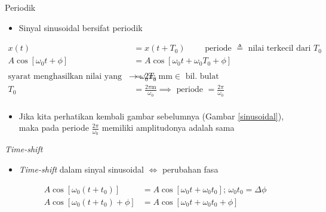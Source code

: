 \documentclass[aspectratio=169]{beamer}
\begin{document}
\begin{frame}{Periodik}
	\begin{itemize}
		\item Sinyal sinusoidal bersifat periodik
	\end{itemize}
	\begin{align*}
		x(t) &= x(t+T_0) \qquad \text{ periode } \triangleq \text{ nilai terkecil dari } T_0 \\
		A \cos[\omega_0 t + \phi] &= A \cos[\omega_0 t + \omega_0 T_0 + \phi] \\
		\\
		\text{syarat menghasilkan nilai yang sama} \rightarrow \omega_0 T_0 &= 2 \pi \text{; m} \text{m} \in \text{ bil. bulat}\\ 
		T_0 &= \frac{2 \pi \text{m}}{\omega_0} \implies \text{ periode } = \frac{2 \pi}{\omega_0} \\
	\end{align*}
	\begin{itemize}
		\item Jika kita perhatikan kembali gambar sebelumnya (Gambar \ref{sinusoidal}), maka pada periode $ \frac{2 \pi}{\omega_0} $ memiliki amplitudonya adalah sama
	\end{itemize}
\end{frame}

\begin{frame}{\textit{Time-shift}}
	\begin{itemize}
		\item \textit{Time-shift} dalam sinyal sinusoidal $ \iff $ perubahan fasa
	\end{itemize}

	\begin{align*}
		A \cos [\omega_0 (t + t_0) ] &= A \cos [\omega_0 t + \omega_0 t_0 ] \text{; } \omega_0 t_0 = \Delta \phi \\
		A \cos [\omega_0 (t + t_0) + \phi ] &= A \cos [\omega_0 t + \omega_0 t_0 + \phi]
	\end{align*}
\end{frame}
\end{document}
